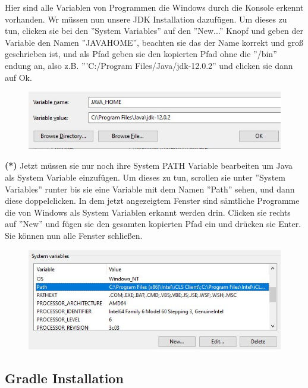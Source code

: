 \documentclass{book}
\begin{document}
Hier sind alle Variablen von Programmen die Windows durch die Konsole erkennt vorhanden. Wr müssen nun unsere JDK Installation dazufügen. Um dieses zu tun, clicken sie bei den ''System Variables'' auf den ''New...'' Knopf und geben der Variable den Namen ''JAVA\textunderscore HOME'', beachten sie das der Name korrekt und groß geschrieben ist, und als Pfad geben sie den kopierten Pfad ohne die ''/bin'' endung an, also z.B. '''C:/Program Files/Java/jdk-12.0.2'' und clicken sie dann auf Ok.
\begin{figure}[h!]
\centering
\includegraphics[width=\linewidth]{JAVA_HOME.JPG}
\end{figure} 

\textbf{(*)}
Jetzt müssen sie nur noch ihre System PATH Variable bearbeiten um Java als System Variable einzufügen. Um dieses zu tun, scrollen sie unter ''System Variables'' runter bis sie eine Variable mit dem Namen ''Path'' sehen, und dann diese doppelclicken. In dem jetzt angezeigtem Fenster sind sämtliche Programme die von Windows als System Variablen erkannt werden drin. Clicken sie rechts auf ''New'' und fügen sie den gesamten kopierten Pfad ein und drücken sie Enter. Sie können nun alle Fenster schließen. 
\begin{figure}[h!]
\centering
\includegraphics[width=\linewidth]{SystemVariables.JPG}
\end{figure} 


\subsection{Gradle Installation}
\end{document}
